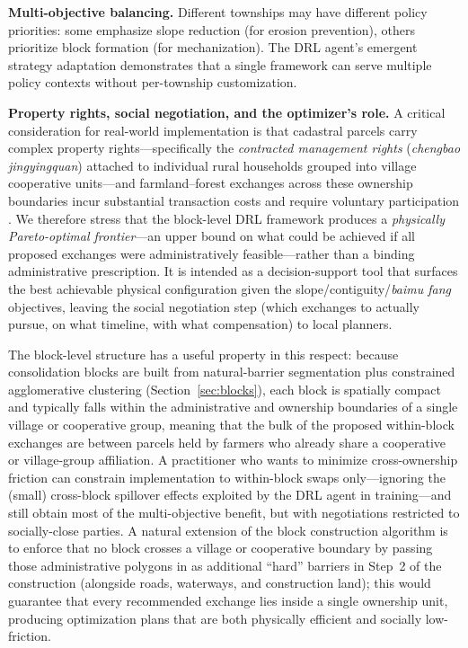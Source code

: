 \documentclass[preprint,12pt]{elsarticle}
\begin{document}
\textbf{Multi-objective balancing.} Different townships may have different policy priorities: some emphasize slope reduction (for erosion prevention), others prioritize block formation (for mechanization). The DRL agent's emergent strategy adaptation demonstrates that a single framework can serve multiple policy contexts without per-township customization.

\textbf{Property rights, social negotiation, and the optimizer's role.} A critical consideration for real-world implementation is that cadastral parcels carry complex property rights---specifically the \textit{contracted management rights} (\textit{chengbao jingyingquan}) attached to individual rural households grouped into village cooperative units---and farmland--forest exchanges across these ownership boundaries incur substantial transaction costs and require voluntary participation \citep{wu2005consolidation}. We therefore stress that the block-level DRL framework produces a \textit{physically Pareto-optimal frontier}---an upper bound on what could be achieved if all proposed exchanges were administratively feasible---rather than a binding administrative prescription. It is intended as a decision-support tool that surfaces the best achievable physical configuration given the slope/contiguity/\textit{baimu fang} objectives, leaving the social negotiation step (which exchanges to actually pursue, on what timeline, with what compensation) to local planners.

The block-level structure has a useful property in this respect: because consolidation blocks are built from natural-barrier segmentation plus constrained agglomerative clustering (Section~\ref{sec:blocks}), each block is spatially compact and typically falls within the administrative and ownership boundaries of a single village or cooperative group, meaning that the bulk of the proposed within-block exchanges are between parcels held by farmers who already share a cooperative or village-group affiliation. A practitioner who wants to minimize cross-ownership friction can constrain implementation to within-block swaps only---ignoring the (small) cross-block spillover effects exploited by the DRL agent in training---and still obtain most of the multi-objective benefit, but with negotiations restricted to socially-close parties. A natural extension of the block construction algorithm is to enforce that no block crosses a village or cooperative boundary by passing those administrative polygons in as additional ``hard'' barriers in Step~2 of the construction (alongside roads, waterways, and construction land); this would guarantee that every recommended exchange lies inside a single ownership unit, producing optimization plans that are both physically efficient and socially low-friction.
\end{document}
